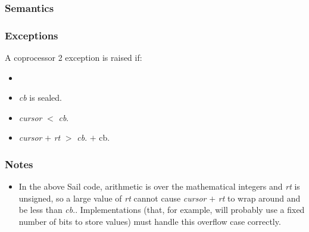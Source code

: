 \subsubsection*{Semantics}


\subsubsection*{Exceptions}

A coprocessor 2 exception is raised if:

\begin{itemize}
\item
\cchecktag{}
\item
\emph{cb} is sealed.
\item
\emph{cursor} $<$ \emph{cb}.\cbase{}
\item
\emph{cursor} $+$ \emph{rt} $>$ \emph{cb}.\cbase{} $+$ cb.\clength{}
\end{itemize}

\subsubsection*{Notes}

\begin{itemize}
\item
In the above Sail code, arithmetic is over the mathematical integers and
\emph{rt} is unsigned, so a large value of \emph{rt} cannot cause
\emph{cursor} $+$ \emph{rt} to wrap around and be less than \emph{cb}.\cbase{}.
Implementations (that, for example, will probably use a fixed number of
bits to store values) must handle this overflow case correctly.
\end{itemize}
